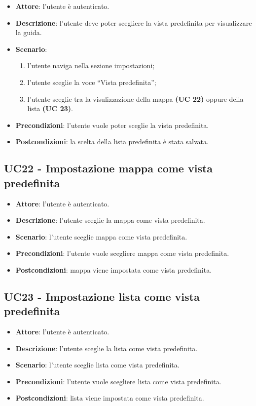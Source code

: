\begin{itemize}
    \item \textbf{Attore}: l'utente è autenticato.
    \item \textbf{Descrizione}: l'utente deve poter scegliere la vista predefinita per visualizzare la guida.
    \item \textbf{Scenario}:
    \begin{enumerate}
        \item l'utente naviga nella sezione impostazioni;
        \item l'utente sceglie la voce “Vista predefinita”;
        \item l'utente sceglie tra la visulizzazione della mappa \textbf{(UC 22)} oppure della lista \textbf{(UC 23)}.
    \end{enumerate}

    \item \textbf{Precondizioni}: l'utente vuole poter sceglie la vista predefinita.
    \item \textbf{Postcondizioni}: la scelta della lista predefinita è stata salvata.
\end{itemize}

\subsection{UC22 - Impostazione mappa come vista predefinita}
\begin{itemize}
    \item \textbf{Attore}: l'utente è autenticato.
    \item \textbf{Descrizione}: l'utente sceglie la mappa come vista predefinita.
    \item \textbf{Scenario}: l'utente sceglie mappa come vista predefinita.
    \item \textbf{Precondizioni}: l'utente vuole scegliere mappa come vista predefinita.
    \item \textbf{Postcondizioni}: mappa viene impostata come vista predefinita.

\end{itemize}

\subsection{UC23 - Impostazione lista come vista predefinita}
\begin{itemize}
    \item \textbf{Attore}: l'utente è autenticato.
    \item \textbf{Descrizione}: l'utente sceglie la lista come vista predefinita.
    \item \textbf{Scenario}: l'utente sceglie lista come vista predefinita.
    \item \textbf{Precondizioni}: l'utente vuole scegliere lista come vista predefinita.
    \item \textbf{Postcondizioni}: lista viene impostata come vista predefinita.
\end{itemize}





